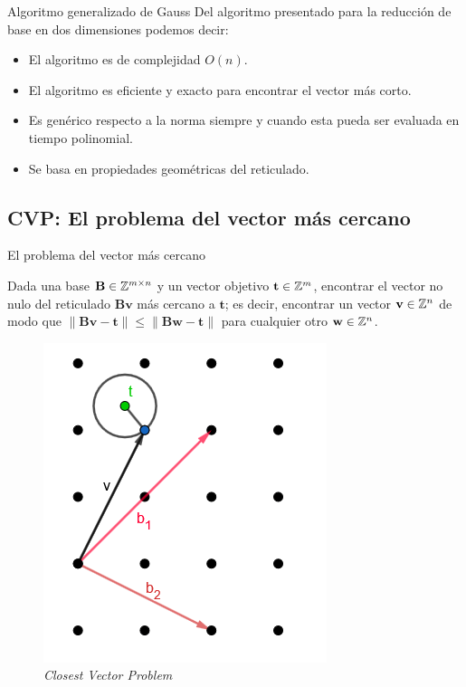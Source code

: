 \begin{frame}{Algoritmo generalizado de Gauss}
Del algoritmo presentado para la reducción de base en dos dimensiones podemos decir:
\begin{itemize}
    \item El algoritmo es de complejidad $O(n)$.
    \item El algoritmo es eficiente y exacto para encontrar el vector más corto.
    \item Es genérico respecto a la norma siempre y cuando esta pueda ser evaluada en tiempo polinomial.
    \item Se basa en propiedades geométricas del reticulado. 
\end{itemize}
\end{frame}

\subsection{CVP: El problema del vector más cercano}

\begin{frame}{El problema del vector más cercano}
\begin{definition}
Dada una base $\mathbf{B}\in \mathbb{Z}^{m\times n}$ y un vector objetivo $\mathbf{t} \in \mathbb{Z}^m$, encontrar el vector no nulo del reticulado $\mathbf{Bv}$ más cercano a $\mathbf{t}$; es decir, encontrar un vector $\mathbf{v}\in \mathbb{Z}^n$ de modo que $\|\mathbf{Bv}-\mathbf{t}\| \leq \|\mathbf{Bw}-\mathbf{t}\|$ para cualquier otro $\mathbf{w} \in \mathbb{Z}^n$.
\end{definition}
\begin{figure}
    \centering
    \includegraphics[width=0.35\linewidth]{figures/The-closest-vector-problem.png}
    \caption{\textit{Closest Vector Problem}}
    \label{fig:cvp-figure}
\end{figure}

\end{frame}

